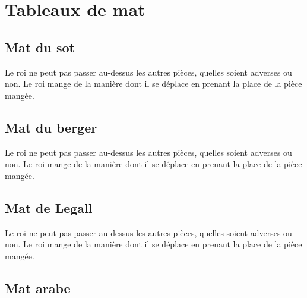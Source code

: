 \documentclass[a5paper,openany,twocolumn]{book}
\begin{document}
{%

\part{Tableaux de mat}

\setcounter{chapter}{0}

\chapter{Mat du sot}
 
Le roi ne peut pas passer au-dessus les autres pièces, quelles soient adverses ou non. Le roi mange de la manière dont il se déplace en prenant la place de la pièce mangée. 


\chapter{Mat du berger}
 
Le roi ne peut pas passer au-dessus les autres pièces, quelles soient adverses ou non. Le roi mange de la manière dont il se déplace en prenant la place de la pièce mangée. 


\chapter{Mat de Legall}

Le roi ne peut pas passer au-dessus les autres pièces, quelles soient adverses ou non. Le roi mange de la manière dont il se déplace en prenant la place de la pièce mangée. 


\chapter{Mat arabe}
 
}
\end{document}
